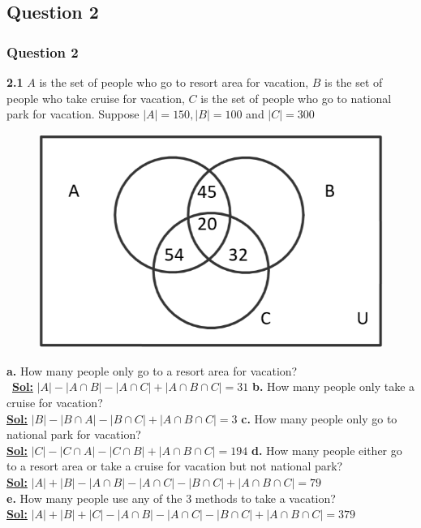 \documentclass[xcolor=svgnames]{beamer}
\begin{document}
\subsection{Question 2}
\begin{frame}
\frametitle{Question 2}
\begin{multicols}{2}
\footnotesize{ 
\textbf{2.1} $A$ is the set of people who go to resort area for vacation, $B$ is the set of people who take cruise for vacation, $C$ is the set of people who go to national park for vacation. Suppose $|A| = 150, |B| = 100$ and $|C|=300$
}
\begin{figure}
\includegraphics[width=0.5\linewidth]{dstut3q2.png}
\end{figure}
\footnotesize{
\textbf{a.} How many people only go to a resort area for vacation? \\\
\textbf{\underline{Sol:}} $|A| - |A \cap B|  - |A \cap C| + |A \cap B \cap C| = 31$
\textbf{b.} How many people only take a cruise for vacation? \\
\textbf{\underline{Sol:}} $|B| - |B \cap A|  - |B \cap C| + |A \cap B \cap C| = 3$
\textbf{c.} How many people only go to national park for vacation? \\
\textbf{\underline{Sol:}} $|C| - |C \cap A|  - |C \cap B| + |A \cap B \cap C| = 194$
\textbf{d.} How many people either go to a resort area or take a cruise for vacation but not national park? \\
\textbf{\underline{Sol:}} $|A| + |B| - |A \cap B| - |A \cap C| - |B \cap C| +  |A \cap B \cap C|  = 79$ \\
\textbf{e.} How many people use any of the 3 methods to take a vacation? \\
\textbf{\underline{Sol:}} $|A| + |B| + |C| - |A \cap B| - |A \cap C| - |B \cap C| +  |A \cap B \cap C|  = 379$
}
\end{multicols} 
\end{frame}
\end{document}
